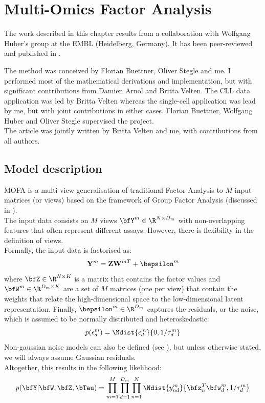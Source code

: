 \graphicspath{{Chapter2/Figs/}}

\section{Multi-Omics Factor Analysis}

The work described in this chapter results from a collaboration with Wolfgang Huber's group at the EMBL (Heidelberg, Germany). It has been peer-reviewed and published in \cite{Argelaguet2018}.

The method was conceived by Florian Buettner, Oliver Stegle and me. I performed most of the mathematical derivations and implementation, but with significant contributions from Damien Arnol and Britta Velten. The CLL data application was led by Britta Velten whereas the single-cell application was lead by me, but with joint contributions in either cases. Florian Buettner, Wolfgang Huber and Oliver Stegle supervised the project.\\
The article was jointly written by Britta Velten and me, with contributions from all authors.


\subsection{Model description} \label{mofa:model_description}
MOFA is a multi-view generalisation of traditional Factor Analysis to $M$ input matrices (or views) based on the framework of Group Factor Analysis (discussed in ).\\
The input data consists on $M$ views $\bfY^m \in \R^{N \times D_m}$ with non-overlapping features that often represent different assays. However, there is flexibility in the definition of views.\\
Formally, the input data is factorised as:
\begin{equation} \label{mofa_master_equation}
	\mathbf{Y}^m = \mathbf{Z}\mathbf{W}^{mT} + \bepsilon^m
\end{equation}
where $\bfZ \in \R^{N \times K}$ is a matrix that contains the factor values and $\bfW^m \in \R^{D_m \times K}$ are a set of $M$ matrices (one per view) that contain the weights that relate the high-dimensional space to the low-dimensional latent representation. Finally, $\bepsilon^m \in \R^{D_m}$ captures the residuals, or the noise, which is assumed to be normally distributed and heteroskedastic:
\begin{equation}
	p(\epsilon^{m}_{d}) = \Ndist{\epsilon^{m}_{d}}{0,1/\tau_{d}^{m}}
\end{equation}
Non-gaussian noise models can also be defined (see ), but unless otherwise stated, we will always assume Gaussian residuals.\\
Altogether, this results in the following likelihood:
\begin{equation}
	p(\bfY|\bfW,\bfZ,\bTau) = \prod_{m=1}^{M} \prod_{d=1}^{D_m} \prod_{n=1}^{N} \Ndist{y_{nd}^m}{\bfz_{n}^T\bfw_{d}^{m},1/\tau_d^m}
\end{equation}

